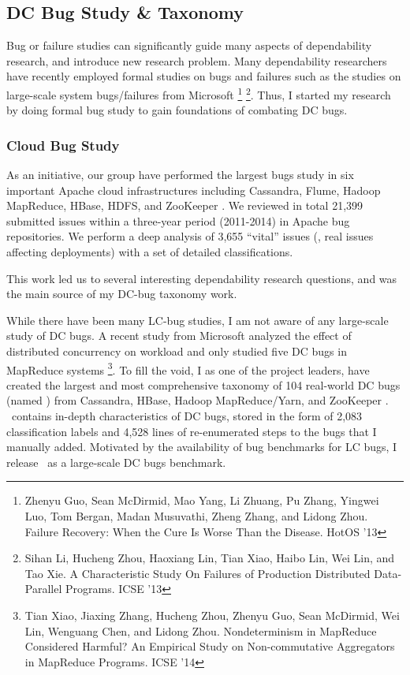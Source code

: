 \documentclass[11pt]{article}
\begin{document}
\subsection{DC Bug Study \& Taxonomy} 

Bug or failure studies can significantly guide many aspects of dependability
research, and introduce new research problem. Many dependability researchers
have recently employed formal studies on bugs and failures such as the studies
on large-scale system bugs/failures from Microsoft \footnote{Zhenyu Guo, Sean
McDirmid, Mao Yang, Li Zhuang, Pu Zhang, Yingwei Luo, Tom Bergan, Madan
Musuvathi, Zheng Zhang, and Lidong Zhou.  Failure Recovery: When the Cure Is
Worse Than the Disease. HotOS '13} \footnote{Sihan Li, Hucheng Zhou, Haoxiang
Lin, Tian Xiao, Haibo Lin, Wei Lin, and Tao Xie. A Characteristic Study On
Failures of Production Distributed Data-Parallel Programs. ICSE '13}.  Thus, I
started my research by doing formal bug study to gain foundations of combating
DC bugs.

\subsubsection{Cloud Bug Study}

As an initiative, our group have performed the largest bugs study in six
important Apache cloud infrastructures including Cassandra, Flume, Hadoop
MapReduce, HBase, HDFS, and ZooKeeper \cite{Gunawi+14-Cbs}. We reviewed in
total 21,399 submitted issues within a three-year period (2011-2014) in Apache
bug repositories. We perform a deep analysis of 3,655 ``vital'' issues (\ie,
real issues affecting deployments) with a set of detailed classifications. 
\fi

This
work led us to several interesting dependability research questions, and was
the main source of my DC-bug taxonomy work.
\fi

While there have been many LC-bug studies, I am not aware of any large-scale
study of DC bugs. A recent study from Microsoft analyzed the effect of
distributed concurrency on workload and only studied five DC bugs in MapReduce
systems \footnote{Tian Xiao, Jiaxing Zhang, Hucheng Zhou, Zhenyu Guo, Sean
McDirmid, Wei Lin, Wenguang Chen, and Lidong Zhou. Nondeterminism in MapReduce
Considered Harmful?  An Empirical Study on Non-commutative Aggregators in
MapReduce Programs. ICSE '14}. To fill the void, I as one of the project
leaders, have created the largest and most comprehensive taxonomy of 104
real-world DC bugs (named \taxdc) from Cassandra, HBase, Hadoop MapReduce/Yarn,
and ZooKeeper \cite{Gunawi+16-TaxDc-Appear}. \taxdc\ contains in-depth
characteristics of DC bugs, stored in the form of 2,083 classification labels
and 4,528 lines of re-enumerated steps to the bugs that I manually added.
Motivated by the availability of bug benchmarks for LC bugs, I release
\taxdc\ as a large-scale DC bugs benchmark.
\end{document}
